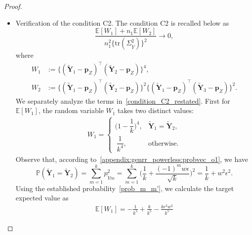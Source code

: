 \documentclass[twoside,11pt]{article}
\newcommand{\rvTwo}{Y}
\newcommand{\rvThree}{Z}
\newcommand{\vectorize}[1]{\mathbf{#1}}
\newcommand{\alphabetSize}{k} %
\newcommand{\vectorIndex}{m}
\newcommand{\sampleSize}{n}
\newcommand{\probVecElement}[2]{p_{{#1}{#2}}}
\newcommand{\probVec}{\mathbf{p}} %
\begin{document}
\begin{appendix}
\begin{proof}
\begin{itemize}
\begin{itemize}
			\item Verification of the condition C2.
			The condition C2 is recalled below as
			\begin{equation}\label{condition_C2_restated}
				\dfrac{
					\mathbb{E}[W_1]
					+
					\sampleSize_1
					\mathbb{E}
					[W_2]
				}{
					\sampleSize_1^2
					\big\{
					\mathrm{tr}(\Sigma_{\tilde{\rvTwo}}^2)
					\big\}^2
				} \to 0,
			\end{equation}
			where
			\begin{align*}
				W_1&:=
				\bigl\{ (\tilde{\vectorize{\rvTwo}}_1 - \probVec_{\rvThree})^\top (\tilde{\vectorize{\rvTwo}}_2
				-
				\probVec_{\rvThree})
				\bigr\}^4,
				\\
				W_2&:=
				\bigl\{ (\tilde{\vectorize{\rvTwo}}_1 - \probVec_{\rvThree})^\top (\tilde{\vectorize{\rvTwo}}_2
				-
				\probVec_{\rvThree})
				\bigr\}^2
				\bigl\{ (\tilde{\vectorize{\rvTwo}}_1 - \probVec_{\rvThree})^\top (\tilde{\vectorize{\rvTwo}}_3
				-
				\probVec_{\rvThree})
				\bigr\}^2.
			\end{align*}
			We separately analyze the terms in~\eqref{condition_C2_restated}.
			First  for $
			\mathbb{E}[W_1]
			$,
			the random variable $W_1$ takes two distinct values:
			\begin{align*}
				W_1
				=
				\begin{cases}
					\biggl(1-\dfrac{1}{\alphabetSize}\biggr)^4, & 
					\tilde{\vectorize{\rvTwo}}_1 = \tilde{\vectorize{\rvTwo}}_2,
					\\[1em]
					~\dfrac{1}{\alphabetSize^4},
					& \text{otherwise.}
				\end{cases}	
			\end{align*}
			Observe that, according to~\eqref{appendix:genrr_powerless:probvec_o1}, we have
			\begin{equation}\label{prob_m_m'}
				\mathbb{P}(\tilde{\vectorize{\rvTwo}}_1 = \tilde{\vectorize{\rvTwo}}_2)
				=
				\sum_{\vectorIndex=1}^\alphabetSize
				\probVecElement{\tilde{\rvTwo}}{\vectorIndex}^2
				= 
				\sum_{\vectorIndex=1}^\alphabetSize
				\biggl(
				\frac{1}{\alphabetSize}
				+
				\frac{
					(-1)^m w \epsilon
				}{
					\sqrt{\alphabetSize}}
				\biggr)^2
				=
				\frac{1}{\alphabetSize}
				+w^2\epsilon^2.
			\end{equation}
			Using the established probability~\eqref{prob_m_m'}, we calculate the target expected value as
			\begin{align*}
				\mathbb{E}[W_1]
				= 
				-\frac{1}{k^5}
				+
				\frac{k}{k^5}
				-
				\frac{k \epsilon^2 w^2 }{k^5}

\end{align*}
\end{itemize}
\end{itemize}
\end{proof}
\end{appendix}
\end{document}
